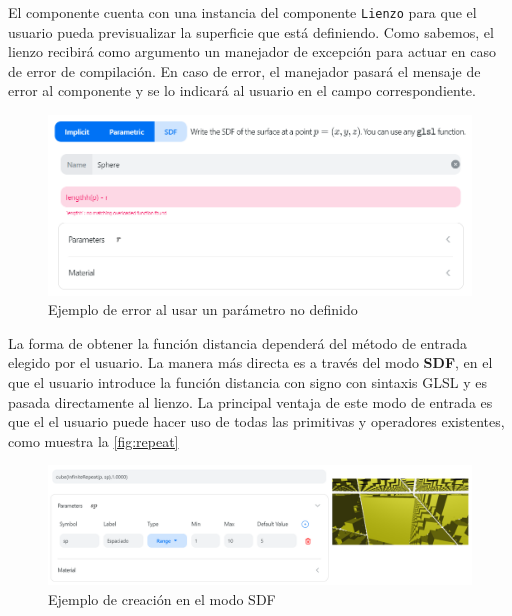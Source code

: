 El componente cuenta con una instancia del componente \texttt{Lienzo} para que el usuario pueda previsualizar la superficie que está definiendo. Como sabemos, el lienzo recibirá como argumento un manejador de excepción para actuar en caso de error de compilación. En caso de error, el manejador pasará el mensaje de error al componente y se lo indicará al usuario en el campo correspondiente.\newline
\begin{figure}[ht!]
    \centering
    \includegraphics[width=\textwidth]{Plantilla-TFG-master/img/error.png}
    \caption{Ejemplo de error al usar un parámetro no definido}
\end{figure}

La forma de obtener la función distancia dependerá del método de entrada elegido por el usuario. La manera más directa es a través del modo \textbf{SDF}, en el que el usuario introduce la función distancia con signo con sintaxis GLSL y es pasada directamente al lienzo. La principal ventaja de este modo de entrada es que el el usuario puede hacer uso de todas las primitivas y operadores existentes, como muestra la \autoref{fig:repeat}\newline
\begin{figure}[ht!]
    \centering
    \includegraphics[width=\textwidth]{Plantilla-TFG-master/img/repeat.png}
    \caption{Ejemplo de creación en el modo SDF}
    \label{fig:repeat}
\end{figure}

